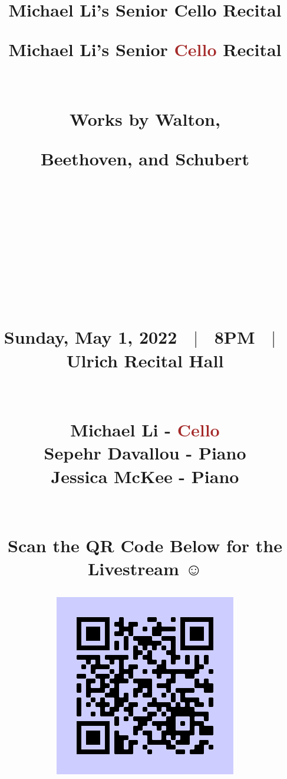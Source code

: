 \documentclass[dvipsnames]{article}
\date{}
\title{Michael Li's Senior Cello Recital}
\begin{document}
\pagecolor{periwinkle}
  \title{
    \begin{Huge}
  \textbf{Michael Li's Senior \textcolor{brown}{Cello} Recital} \\ ~ \\ ~ \\
  Works by Walton,

  Beethoven, and Schubert \\ ~ \\ ~ \\
  \end{Huge}


   \hline \\ ~ \\ ~ \\ ~ \\

   Sunday, May 1, 2022 $\, \, \mid \, \,$ 8PM $\, \,\mid \, \,$ Ulrich Recital Hall \\ ~ \\ ~ \\

  Michael Li - \textcolor{brown}{Cello} \\

  Sepehr Davallou - Piano \\

  Jessica McKee - Piano \\ ~ \\ ~ \\

  Scan the QR Code Below for the Livestream $\smiley{}$

  \begin{center}
  \includegraphics[scale=0.6]{qr}
  \end{center}
 }
  \maketitle
\end{document}
